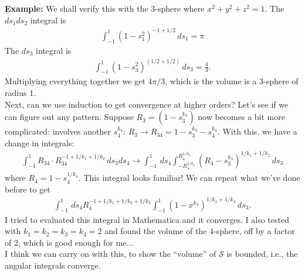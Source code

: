 \documentclass{article}
\theoremstyle{definition}
\newcommand{\f}[2]{\frac{#1}{#2}}
\begin{document}
\textbf{Example:} We shall verify this with the 3-sphere where $x^2 + y^2 + z^2 = 1$. The $ds_1ds_2$ integral is 
\begin{align}
\int^1_{-1} (1-s_1^2)^{-1+1/2}\,ds_1 = \pi
\end{align}
The $ds_3$ integral is 
\begin{align}
\int_{-1}^{1} (1-s_3^2)^{(1/2+1/2)}\,ds_3 = \f{4}{3}.
\end{align}	
Multiplying everything together we get $4\pi / 3$, which is the volume is a 3-sphere of radius 1. \qedhere \\


Next, can we use induction to get convergence at higher orders? Let's see if we can figure out any pattern. Suppose $R_3 = (1-s_3^{k_3})$ now becomes a bit more complicated: involves another $s_4^{k_4}$: $R_{3} \to R_{34} = 1 - s_3^{k_3} - s_4^{k_4}$. With this, we have a change in integrals:
\begin{align}
\int^1_{-1}R_{34}\cdot R_{34}^{-1+1/k_1+1/k_2}\,ds_3ds_4 \to \int^1_{-1}\,ds_4 \int^{R_4^{1/k_4}}_{-R_4^{1/k_4}}(R_4 - s_3^{k_3})^{1/k_1+1/k_2}\,ds_3
\end{align}
where $R_4 = 1 - s_4^{1/k_4}$. This integral looks familiar! We can repeat what we've done before to get
\begin{align}
\int^1_{-1}\,ds_4 R_4^{-1+1/k_1+1/k_2+1/k_3}\int^{1}_{-1}(1 - x^{k_3})^{1/k_1+1/k_2}\,ds_3.
\end{align}
I tried to evaluated this integral in Mathematica and it converges. I also tested with $k_1 = k_2 = k_3 = k_4 = 2$ and found the volume of the 4-sphere, off by a factor of 2, which is good enough for me... \\

I think we can carry on with this, to show the ``volume'' of $\mathcal{S}$ is bounded, i.e., the angular integrals converge.  

	
	
	
\end{document}
